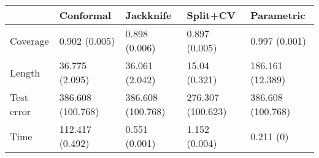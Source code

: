 \begin{tabular}{|l|l|l|l|l|}
\hline
& Conformal & Jackknife & Split+CV & Parametric \\
\hline
Coverage & 0.902 (0.005) & 0.898 (0.006) & 0.897 (0.005) & 0.997 (0.001) \\
\hline
Length & 36.775 (2.095) & 36.061 (2.042) & 15.04 (0.321) & 186.161 (12.389) \\
\hline
Test error & 386.608 (100.768) & 386.608 (100.768) & 276.307 (100.623) & 386.608 (100.768) \\
\hline
Time & 112.417 (0.492) & 0.551 (0.001) & 1.152 (0.004) & 0.211 (0) \\
\hline
\end{tabular}
